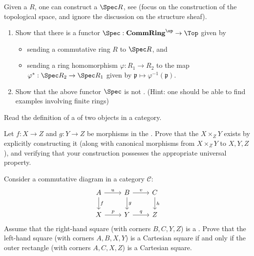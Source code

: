 \begin{problem}
    Given a  $R$, one can construct a  $\Spec R$, see  (focus on the construction of the topological space, and ignore the discussion on the structure sheaf).
    \begin{enumerate}
        \item Show that there is a functor $\Spec: \mathbf{CommRing}^{\op} \to \Top$ given by
        \begin{itemize}
            \item sending a commutative ring $R$ to $\Spec R$, and 
            \item sending a ring homomorphism $\varphi: R_1 \to R_2$ to the map $\varphi^*: \Spec R_2 \to \Spec R_1$ given by $\mathfrak{p} \mapsto \varphi^{-1}(\mathfrak{p})$.
        \end{itemize}
        \item Show that the above functor $\Spec$ is not . (Hint: one should be able to find examples involving finite rings)
    \end{enumerate}
\end{problem}


Read the definition of a  of two objects in a category.

\begin{problem}
    Let $f:X \to Z$ and $g: Y \to Z$ be morphisms in the . Prove that the  $X \times_Z Y$ exists by explicitly constructing it (along with canonical morphisms from $X \times_Z Y$ to $X,Y,Z$), and verifying that your construction possesses the appropriate universal property.
\end{problem}


\begin{problem}
    Consider a commutative diagram in a category $\mathcal{C}$:
    \[
    \begin{tikzcd}
        A \arrow[r, "u"] \arrow[d, "f"] & B \arrow[r, "v"] \arrow[d, "g"] & C \arrow[d, "h"] \\
        X \arrow[r, "p"] & Y \arrow[r, "q"] & Z
    \end{tikzcd}
    \]
    Assume that the right-hand square (with corners $B, C, Y, Z$) is a .
    Prove that the left-hand square (with corners $A, B, X, Y$) is a Cartesian square if and only if the outer rectangle (with corners $A, C, X, Z$) is a Cartesian square.
\end{problem}

